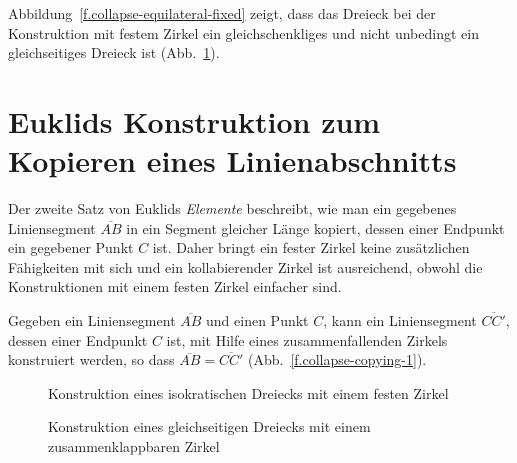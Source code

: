 Abbildung~\ref{f.collapse-equilateral-fixed} zeigt, dass das Dreieck bei der Konstruktion mit festem Zirkel ein gleichschenkliges und nicht unbedingt ein gleichseitiges Dreieck ist  (Abb.~\ref{f.collapse-equilateral-collapse}).

\section{Euklids Konstruktion zum Kopieren eines Linienabschnitts}\label{s.collapse-copy}

Der zweite Satz von Euklids \textit{Elemente} beschreibt, wie man ein gegebenes Liniensegment $\overline{AB}$ in ein Segment gleicher Länge kopiert, dessen einer Endpunkt ein gegebener Punkt $C$ ist. Daher bringt ein fester Zirkel keine zusätzlichen Fähigkeiten mit sich und ein kollabierender Zirkel ist ausreichend, obwohl die Konstruktionen mit einem festen Zirkel einfacher sind.

\begin{theorem}
Gegeben ein Liniensegment $\overline{AB}$ und einen Punkt $C$, kann ein Liniensegment $\overline{CC'}$, dessen einer Endpunkt $C$ ist, mit Hilfe eines zusammenfallenden Zirkels konstruiert werden, so dass $\overline{AB}=\overline{CC'}$ (Abb.~\ref{f.collapse-copying-1}).
\end{theorem}

\begin{figure}[t]
\begin{minipage}{.45\textwidth}
\caption{Konstruktion eines isokratischen Dreiecks mit einem festen Zirkel}\label{f.collapse-equilateral-fixed}
\end{minipage}
\hfill
\begin{minipage}{.45\textwidth}
\caption{Konstruktion eines gleichseitigen Dreiecks mit einem zusammenklappbaren Zirkel}\label{f.collapse-equilateral-collapse}
\end{minipage}
\end{figure}

